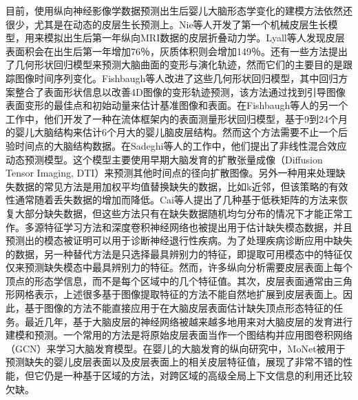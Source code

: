 目前，使用纵向神经影像学数据预测出生后婴儿大脑形态学变化的建模方法依然还很少，尤其是在动态的皮层生长预测上。Nie等人\cite{nie2012computational}开发了第一个机械皮层生长模型，用来模拟出生后第一年纵向MRI数据的皮层折叠动力学。Lyall等人\cite{lyall2015dynamic}发现皮层表面积会在出生后第一年增加76％，灰质体积则会增加149％。还有一些方法\cite{nie2012computational,fletcher2013geodesic}提出了几何形状回归模型来预测大脑曲面的变形与演化轨迹，然而它们的主要目的是跟踪图像时间序列变化。Fishbaugh等人\cite{fishbaugh2014geodesic}改进了这些几何形状回归模型，其中回归方案整合了表面形状信息以改善4D图像的变形轨迹预测，该方法通过找到引导图像表面变形的最佳点和初始动量来估计基准图像和表面。在Fishbaugh等人的另一个工作中\cite{fishbaugh2013geodesic}，他们开发了一种在流体框架内的表面测量形状回归模型，基于9到24个月的婴儿大脑结构来估计6个月大的婴儿脑皮层结构。然而这个方法需要不止一个后验时间点的大脑结构数据。在Sadeghi等人\cite{sadeghi2014subject}的工作中，他们提出了非线性混合效应动态预测模型。这个模型主要使用早期大脑发育的扩散张量成像（Diffusion Tensor Imaging, DTI）来预测其他时间点的径向扩散图像。另外一种用来处理缺失数据的常见方法是用加权平均值替换缺失的数据，比如k近邻\cite{ching2010weighted}，但该策略的有效性通常随着丢失数据的增加而降低。Cai等人\cite{cai2010singular}提出了几种基于低秩矩阵的方法来恢复大部分缺失数据，但这些方法只有在缺失数据随机均匀分布的情况下才能正常工作。多源特征学习方法\cite{yuan2012multi}和深度卷积神经网络\cite{li2014deep}也被提出用于估计缺失模态数据，并且预测出的模态被证明可以用于诊断神经退行性疾病。为了处理疾病诊断应用中缺失的数据，另一种替代方法是只选择最具辨别力的特征，即提取可用模态中的特征仅仅来预测缺失模态中最具辨别力的特征\cite{thung2014neurodegenerative}。然而，许多纵向分析需要皮层表面上每个顶点的形态学信息，而不是每个区域中的几个特征值。其次，皮层表面通常由三角形网格表示，上述很多基于图像提取特征的方法\cite{li2014deep,thung2014neurodegenerative}不能自然地扩展到皮层表面上。因此，基于图像的方法不能直接应用于在大脑皮层表面估计缺失顶点形态特征的任务。最近几年，基于大脑皮层的神经网络被越来越多地用来对大脑皮层的发育进行建模和预测。一个常用的方法是将原始皮层表面当作一个图结构并应用图卷积网络（GCN）\cite{gopinath2019adaptive,gopinath2019graph}来学习大脑发育模型。在婴儿的大脑发育的纵向研究中，MoNet\cite{monti2017geometric}被用于预测缺失的婴儿皮层表面\cite{liu2019deep}以及皮层表面上的相关皮层特征值，展现了非常不错的性能，但它仍是一种基于区域的方法，对跨区域的高级全局上下文信息的利用还比较欠缺。


